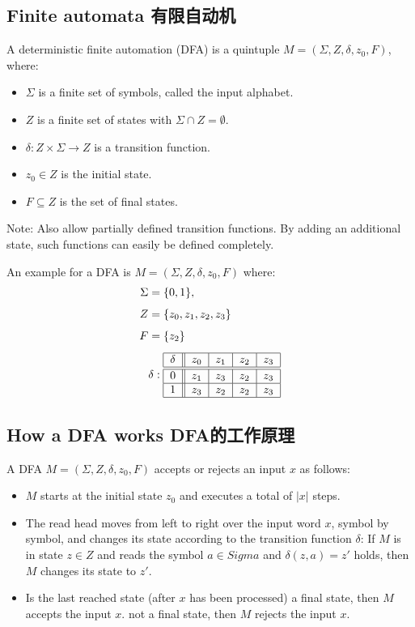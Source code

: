 \documentclass[a4paper,11pt,utf8]{article}
\begin{document}
\subsection{Finite automata 有限自动机}
A deterministic finite automation (DFA) is a quintuple $M = (\Sigma,Z,\delta,z_0,F)$, where:
\begin{itemize}
    \item $\Sigma$ is a finite set of symbols, called the input alphabet.
    \item $Z$ is a finite set of states with $\Sigma \cap Z = \emptyset$.
    \item $\delta: Z \times \Sigma \to Z$ is a transition function.
    \item $z_0 \in Z$ is the initial state.
    \item $F \subseteq Z$ is the set of final states.
\end{itemize}
\lineindent Note: Also allow partially defined transition functions. By adding an additional state, such functions can easily be defined completely.
\begin{tcolorbox}[title=example,colback=white,colframe=black,width=\textwidth,arc=0pt]
    An example for a DFA is $M = (\Sigma,Z,\delta,z_0,F)$ where:
    \[
        \begin{aligned}
            \Sigma &= \{0,1\}, \\[1ex]
            Z &= \{z_0,z_1,z_2,z_3\} \\[1ex]
            F &= \{z_2\} \\[1ex]
            &\delta: \begin{tabular}{|c||c|c|c|c|}
                \hline
                $\delta$ & $z_0$ & $z_1$ & $z_2$ & $z_3$ \\
                \hline
                \hline
                0 & $z_1$ & $z_3$ & $z_2$ & $z_3$ \\
                \hline
                1 & $z_3$ & $z_2$ & $z_2$ & $z_3$ \\
                \hline
            \end{tabular}
        \end{aligned}
    \]
\end{tcolorbox}
\subsection{How a DFA works DFA的工作原理}
A DFA $M = (\Sigma,Z,\delta,z_0,F)$ accepts or rejects an input $x$ as follows:
\begin{itemize}
    \item $M$ starts at the initial state $z_0$ and executes a total of $|x|$ steps.
    \item The read head moves from left to right over the input word $x$, symbol by symbol, and changes its state according to the transition function $\delta$: If $M$ is in state $z \in Z$ and reads the symbol $a \in Sigma$ and $\delta(z,a) = z'$ holds, then $M$ changes its state to $z'$.
    \item Is the last reached state (after $x$ has been processed)
    \subitem a final state, then $M$ accepts the input $x$.
    \subitem not a final state, then $M$ rejects the input $x$.
\end{itemize}
\end{document}
